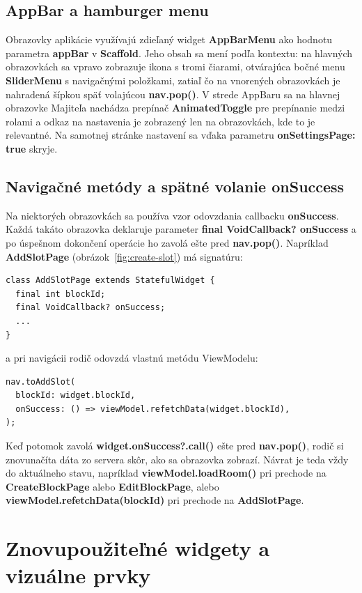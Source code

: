 \subsection{AppBar a hamburger menu}
\label{subsec:impl-appbar}
Obrazovky aplikácie využívajú zdieľaný widget \textbf{AppBarMenu} 
ako hodnotu parametra \textbf{appBar} v \textbf{Scaffold}. 
Jeho obsah sa mení podľa kontextu: na hlavných obrazovkách
sa vpravo zobrazuje ikona s tromi čiarami, otvárajúca bočné menu \textbf{SliderMenu} s navigačnými položkami, zatiaľ čo na vnorených obrazovkách je nahradená šípkou späť volajúcou \textbf{nav.pop()}.
V strede AppBaru sa na hlavnej obrazovke Majiteľa nachádza
prepínač \textbf{AnimatedToggle} pre prepínanie medzi rolami a odkaz na nastavenia je zobrazený len na obrazovkách, kde to je relevantné. Na samotnej stránke nastavení sa vďaka parametru \textbf{onSettingsPage: true} skryje.

\subsection{Navigačné metódy a spätné volanie onSuccess}
\label{subsec:implonsuccess}
Na niektorých obrazovkách sa používa vzor
odovzdania callbacku \textbf{onSuccess}. Každá takáto obrazovka deklaruje parameter \textbf{final VoidCallback? onSuccess}
a po úspešnom dokončení operácie ho zavolá ešte pred \textbf{nav.pop()}.
Napríklad \textbf{AddSlotPage} (obrázok~\ref{fig:create-slot}) má signatúru:
\begin{verbatim}
class AddSlotPage extends StatefulWidget {
  final int blockId;
  final VoidCallback? onSuccess;
  ...
}
\end{verbatim}
\noindent a pri navigácii rodič odovzdá vlastnú metódu ViewModelu:
\begin{verbatim}
nav.toAddSlot(
  blockId: widget.blockId,
  onSuccess: () => viewModel.refetchData(widget.blockId),
);
\end{verbatim}
Keď potomok zavolá \textbf{widget.onSuccess?.call()} ešte pred
\textbf{nav.pop()}, rodič si znovunačíta dáta zo servera skôr,
ako sa obrazovka zobrazí. Návrat je teda vždy do aktuálneho stavu, napríklad \textbf{viewModel.loadRoom()} pri prechode na
\textbf{CreateBlockPage} alebo \textbf{EditBlockPage}, alebo
\textbf{viewModel.refetchData(blockId)} pri prechode na \textbf{AddSlotPage}.

\section{Znovupoužiteľné widgety a vizuálne prvky}
\label{sec:impl-custom-widgets}

